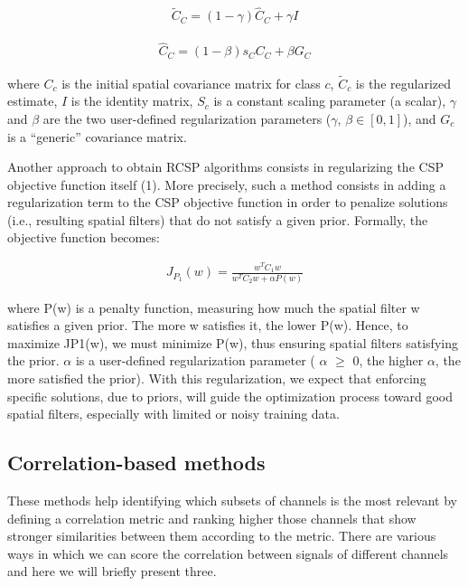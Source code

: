 \documentclass{Configuration_Files/PoliMi3i_thesis}
\begin{document}
\begin{align}
	\tilde{C}_{C} = (1 - \gamma) \hat{C}_{C} + \gamma I
	\label{eq:RCSP1}
\end{align}

\begin{align}
	\hat{C}_{C} = (1 - \beta) {s}_{C} {C}_{C} + \beta {G}_{C}
	\label{eq:RCSP2}
\end{align}


where $C_{c}$ is the initial spatial covariance matrix for class $c$, $\tilde{C}_{c}$ is the regularized estimate, $I$ is the identity matrix, $S_{c}$ is a constant scaling parameter (a scalar), $\gamma$ and $\beta$ are the two user-defined regularization parameters ($\gamma$, $\beta \in [0,1]$), and $G_{c}$ is a “generic” covariance matrix. \cite{lotteRegularizingCommonSpatial2011}

Another approach to obtain RCSP algorithms consists in regularizing the CSP objective function itself (1). More precisely, such a method consists in adding a regularization term to the CSP objective function in order to penalize solutions (i.e., resulting spatial filters) that do not satisfy a given prior. Formally, the objective function becomes:

\begin{align}
	{J}_{P_{1}}(w) = \frac{w^{T}C_{1}w}{w^{T}C_{2}w + \alpha P(w)}
	\label{eq:RCSP3}
\end{align}

where P(w) is a penalty function, measuring how much the spatial filter w satisfies a given prior. The more w satisfies it, the lower P(w). Hence, to maximize JP1(w), we must minimize P(w), thus ensuring spatial filters satisfying the prior. $\alpha$ is a user-defined regularization parameter ( $\alpha$ $\geq$  0, the higher $\alpha$, the more satisfied the prior). With this regularization, we expect that enforcing specific solutions, due to priors, will guide the optimization process toward good spatial filters, especially with limited or noisy training data. \cite{lotteRegularizingCommonSpatial2011}


\subsection{Correlation-based methods}

These methods help identifying which subsets of channels is the most relevant by defining a correlation metric and ranking higher those channels that show stronger similarities between them according to the metric.
There are various ways in which we can score the correlation between signals of different channels and here we will briefly present three.
\end{document}
